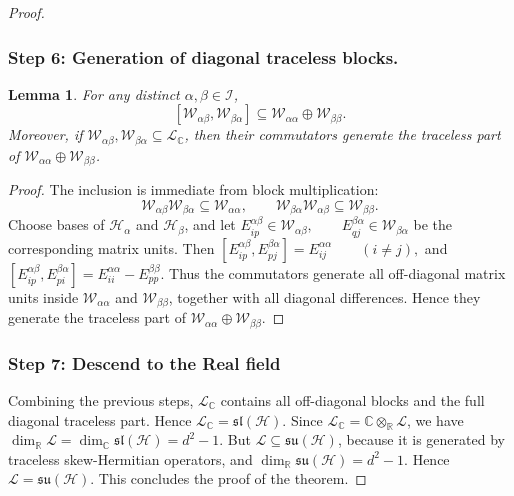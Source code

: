 \documentclass[11pt,letterpaper]{article}
\theoremstyle{plain}
\theoremstyle{plain}
\theoremstyle{plain}
\theoremstyle{plain}
\theoremstyle{plain}
\theoremstyle{plain}
\newcommand{\C}{\mathbb{C}}
\newcommand{\R}{\mathbb{R}}
\newcommand{\su}{\mathfrak{su}}
\newcommand{\HH}{\mathcal{H}}
\theoremstyle{plain}
\newtheorem{smlemma}[smtheorem]{Lemma}
\theoremstyle{definition}
\theoremstyle{plain}
\begin{document}
\begin{proof}
\subsubsection*{Step 6: Generation of diagonal traceless blocks.}


\begin{smlemma}\label{lem:diag_blocks}
For any distinct \(\alpha,\beta\in\mathcal I\),
\[
[\mathcal W_{\alpha\beta},\mathcal W_{\beta\alpha}]
\subseteq
\mathcal W_{\alpha\alpha}\oplus \mathcal W_{\beta\beta}.
\]
Moreover, if \(\mathcal W_{\alpha\beta},\mathcal W_{\beta\alpha}\subseteq \mathcal L_\C\), then
their commutators generate the traceless part of
\(\mathcal W_{\alpha\alpha}\oplus \mathcal W_{\beta\beta}\).
\end{smlemma}

\begin{proof}
The inclusion is immediate from block multiplication:
\[
\mathcal W_{\alpha\beta}\mathcal W_{\beta\alpha}\subseteq \mathcal W_{\alpha\alpha},
\qquad
\mathcal W_{\beta\alpha}\mathcal W_{\alpha\beta}\subseteq \mathcal W_{\beta\beta}.
\]
Choose bases of \(\HH_\alpha\) and \(\HH_\beta\), and let
$
E^{\alpha\beta}_{ip}\in \mathcal W_{\alpha\beta},
\qquad
E^{\beta\alpha}_{qj}\in \mathcal W_{\beta\alpha}
$
be the corresponding matrix units. Then
$
[E^{\alpha\beta}_{ip},E^{\beta\alpha}_{pj}]
=
E^{\alpha\alpha}_{ij}
\qquad (i\neq j),
$
and
$
[E^{\alpha\beta}_{ip},E^{\beta\alpha}_{pi}]
=
E^{\alpha\alpha}_{ii}-E^{\beta\beta}_{pp}.
$
Thus the commutators generate all off-diagonal matrix units inside
\(\mathcal W_{\alpha\alpha}\) and \(\mathcal W_{\beta\beta}\), together with all diagonal differences. Hence they generate the traceless part of
\(\mathcal W_{\alpha\alpha}\oplus \mathcal W_{\beta\beta}\).
\end{proof}

\subsubsection*{Step 7: Descend to the Real field}

Combining the previous steps, \(\mathcal L_\C\) contains all off-diagonal blocks and the full diagonal traceless part. Hence
$
\mathcal L_\C=\mathfrak{sl}(\HH).
$ 
Since $\mathcal L_\C = \mathbb{C}\otimes_\R \mathcal L$, we have
$
\dim_\R \mathcal L=\dim_\C \mathfrak{sl}(\HH)=d^2-1.
$
But \(\mathcal L\subseteq \su(\HH)\), because it is generated by traceless skew-Hermitian operators, and
$
\dim_\R \su(\HH)=d^2-1.
$
Hence
$
\mathcal L=\su(\HH).
$
This concludes the proof of the theorem.
\end{proof}
\end{document}
